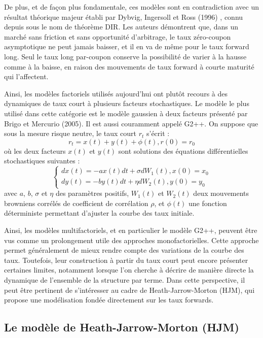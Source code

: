 De plus, et de façon plus fondamentale, ces modèles sont en contradiction avec un résultat théorique majeur établi par Dybvig, Ingersoll et Ross (1996) \cite{theoreme_dir}, connu depuis sous le nom de théorème DIR. Les auteurs démontrent que, dans un marché sans friction et sans opportunité d'arbitrage, le taux zéro-coupon asymptotique ne peut jamais baisser, et il en va de même pour le taux forward long. Seul le taux long par-coupon conserve la possibilité de varier à la hausse comme à la baisse, en raison des mouvements de taux forward à courte maturité qui l'affectent.

Ainsi, les modèles factoriels utilisés aujourd'hui ont plutôt recours à des dynamiques de taux court à plusieurs facteurs stochastiques. Le modèle le plus utilisé dans cette catégorie est le modèle gaussien à deux facteurs présenté par Brigo et Mercurio (2005). Il est aussi couramment appelé G2++. 
On suppose que sous la mesure risque neutre, le taux court $r_t$ s'écrit :
\begin{equation}
r_t = x(t) + y(t) + \phi(t),    r(0) = r_0
\end{equation}
où les deux facteurs $x(t)$ et $y(t)$ sont solutions des équations différentielles stochastiques suivantes :
\begin{equation}
\begin{cases}
dx(t) = -a x(t) dt + \sigma dW_1(t),    x(0) = x_0 \\
dy(t) = -b y(t) dt + \eta dW_2(t),    y(0) = y_0
\end{cases}
\end{equation}
avec $a$, $b$, $\sigma$ et $\eta$ des paramètres positifs, $W_1(t)$ et $W_2(t)$ deux mouvements browniens corrélés de coefficient de corrélation $\rho$, et $\phi(t)$ une fonction déterministe permettant d'ajuster la courbe des taux initiale.

Ainsi, les modèles multifactoriels, et en particulier le modèle G2++, peuvent être vus comme un prolongement utile des approches monofactorielles. Cette approche permet généralement de mieux rendre compte des variations de la courbe des taux. 
Toutefois, leur construction à partir du taux court peut encore présenter certaines limites, notamment lorsque l'on cherche à décrire de manière directe la dynamique de l'ensemble de la structure par terme. Dans cette perspective, il peut être pertinent de s'intéresser au cadre de Heath-Jarrow-Morton (HJM), qui propose une modélisation fondée directement sur les taux forwards.

\subsection{Le modèle de Heath-Jarrow-Morton (HJM)}

